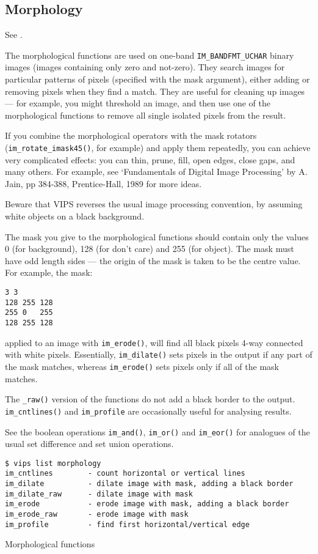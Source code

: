 \subsection{Morphology}

See .

The morphological functions are used on one-band \verb+IM_BANDFMT_UCHAR+ binary
images (images containing only zero and not-zero). They search images
for particular patterns of pixels (specified with the mask argument),
either adding or removing pixels when they find a match. They are useful
for cleaning up images --- for example, you might threshold an image, and
then use one of the morphological functions to remove all single isolated
pixels from the result.

If you combine the morphological operators with the mask rotators
(\verb+im_rotate_imask45()+, for example) and apply them repeatedly, you
can achieve very complicated effects: you can thin, prune, fill, open edges,
close gaps, and many others. For example, see `Fundamentals  of  Digital
Image Processing' by A.  Jain, pp 384-388, Prentice-Hall, 1989 for more ideas.

Beware that VIPS reverses the usual image processing convention, by assuming
white objects on a black background.

The mask you give to the morphological functions should contain only the
values 0 (for background), 128 (for don't care) and 255 (for object). The
mask must have odd length sides --- the origin of the mask is taken to be
the centre value. For example, the mask:

\begin{verbatim}
3 3 
128 255 128
255 0   255
128 255 128
\end{verbatim}
  
\noindent
applied to an image with \verb+im_erode()+, will find all black pixels
4-way connected with white pixels. Essentially, \verb+im_dilate()+
sets  pixels  in the output  if  any part of the mask matches, whereas
\verb+im_erode()+ sets pixels only if all of the mask matches.

The \verb+_raw()+ version of the functions do not add a black border to the
output. \verb+im_cntlines()+ and \verb+im_profile+ are occasionally useful for 
analysing results.

See the boolean operations \verb+im_and()+, \verb+im_or()+  and
\verb+im_eor()+ for  analogues of  the  usual  set difference and set
union operations.

\begin{fig2}
\begin{verbatim}
$ vips list morphology
im_cntlines        - count horizontal or vertical lines
im_dilate          - dilate image with mask, adding a black border
im_dilate_raw      - dilate image with mask
im_erode           - erode image with mask, adding a black border
im_erode_raw       - erode image with mask
im_profile         - find first horizontal/vertical edge
\end{verbatim}
\caption{Morphological functions}
\label{fg:morph}
\end{fig2}

